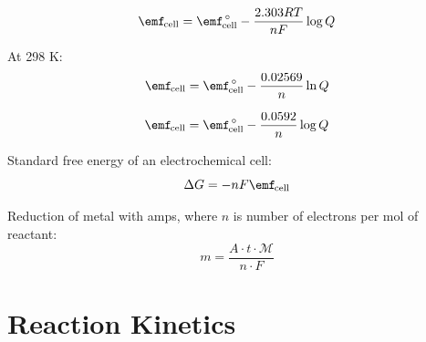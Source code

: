 \documentclass[10pt]{article}
\def\MM{\mathcal{M}}
\begin{document}
\begin{equation*}
\textnormal{\Ecell} = \textnormal{\Enotcell} - \frac{2.303RT}{nF}\log Q
\end{equation*}

At 298 K:
\begin{equation*}
\textnormal{\Ecell} = \textnormal{\Enotcell} - \frac{0.02569}{n}\ln Q
\end{equation*}

\begin{equation*}
\textnormal{\Ecell} = \textnormal{\Enotcell} - \frac{0.0592}{n}\log Q
\end{equation*}


Standard free energy of an electrochemical cell:
\begin{equation*}
\Delta G = -nF\textnormal{\Ecell}
\end{equation*}

Reduction of metal with amps, where $n$ is number of electrons per mol of reactant:
\begin{equation*}
m = \frac{A \cdot t \cdot \MM}{n \cdot F}
\end{equation*}



\section{Reaction Kinetics}
\end{document}
